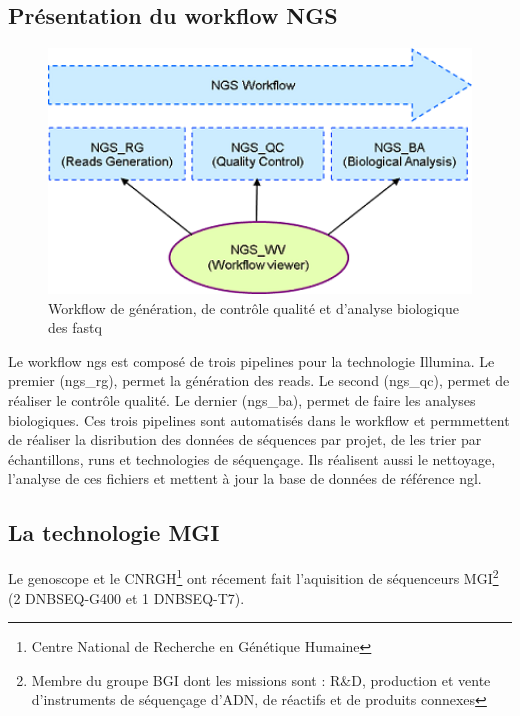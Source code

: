 \subsection{Présentation du workflow NGS}
\begin{minipage}{0.45\textwidth}
	\begin{figure}[H]
		\centering
		\includegraphics[width=1\textwidth]{img/Workflow.png}
		\caption{\footnotesize{Workflow de génération, de contrôle qualité et d’analyse biologique des fastq}}
		\label{worflow-genoscope}
	\end{figure}
\end{minipage} 
\hfill
\begin{minipage}{0.45\textwidth}
	Le workflow ngs est composé de trois pipelines pour la technologie Illumina. Le premier (ngs\_rg), permet la génération des reads. Le second (ngs\_qc), permet de réaliser le contrôle qualité. Le dernier (ngs\_ba), permet de faire les analyses biologiques. Ces trois pipelines sont automatisés dans le workflow et permmettent de réaliser la disribution des données de séquences par projet, de les trier par échantillons, runs et technologies de séquençage. Ils réalisent aussi le nettoyage, l'analyse de ces fichiers et mettent à jour la base de données de référence ngl.
\end{minipage} 

\subsection{La technologie MGI}
Le genoscope et le CNRGH\footnote{Centre National de Recherche en Génétique Humaine} ont récement fait l'aquisition de séquenceurs MGI\footnote{Membre du groupe BGI dont les missions sont : R\&D, production et vente d'instruments de séquençage d'ADN, de réactifs et de produits connexes} (2 DNBSEQ-G400 et 1 DNBSEQ-T7).

